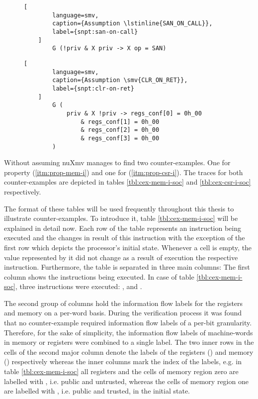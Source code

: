 \begin{figure}
    \begin{lstlisting}[
        language=smv,
        caption={Assumption \lstinline{SAN_ON_CALL}},
        label={snpt:san-on-call}
    ]
        G (!priv & X priv -> X op = SAN)
    \end{lstlisting}

    \begin{lstlisting}[
        language=smv,
        caption={Assumption \smv{CLR_ON_RET}},
        label={snpt:clr-on-ret}
    ]
        G (
            priv & X !priv -> regs_conf[0] = 0h_00
                & regs_conf[1] = 0h_00
                & regs_conf[2] = 0h_00
                & regs_conf[3] = 0h_00
        )
    \end{lstlisting}
\end{figure}

Without assuming  nuXmv manages to find two counter-examples.
One for property  (\ref{itm:prop-mem-i}) and one for  (\ref{itm:prop-csr-i}).
The traces for both counter-examples are depicted in tables \ref{tbl:cex-mem-i-soc} and \ref{tbl:cex-csr-i-soc} respectively.

The format of these tables will be used frequently throughout this thesis to illustrate counter-examples.
To introduce it, table \ref{tbl:cex-mem-i-soc} will be explained in detail now.
Each row of the table represents an instruction being executed and the changes in result of this instruction with the exception of the first row which depicts the processor's initial state.
Whenever a cell is empty, the value represented by it did not change as a result of execution the respective instruction.
Furthermore, the table is separated in three main columns: The first column shows the instructions being executed.
In case of table \ref{tbl:cex-mem-i-soc}, three instructions were executed: ,  and .

The second group of columns hold the information flow labels for the registers and memory on a per-word basis.
During the verification process it was found that no counter-example required information flow labels of a per-bit granularity.
Therefore, for the sake of simplicity, the information flow labels of machine-words in memory or registers were combined to a single label.
The two inner rows in the cells of the second major column denote the labels of the registers () and memory () respectively whereas the inner columns mark the index of the labels, e.g. in table \ref{tbl:cex-mem-i-soc} all registers and the cells of memory region zero are labelled with \PU{}, i.e. public and untrusted, whereas the cells of memory region one are labelled with \PT{}, i.e. public and trusted, in the initial state.

